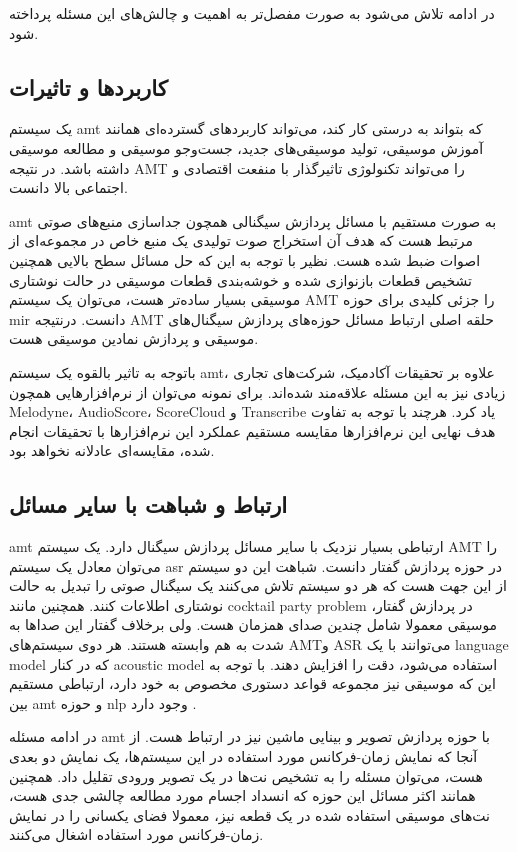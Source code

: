 در ادامه تلاش می‌شود به صورت مفصل‌تر به اهمیت و چالش‌های این مسئله پرداخته شود.

\subsection{کاربردها و تاثیرات}
یک سیستم \gls{amt} که بتواند به درستی کار کند، می‌تواند کاربردهای گسترده‌ای
همانند آموزش موسیقی، تولید موسیقی‌های جدید، جست‌وجو موسیقی و مطالعه موسیقی داشته
باشد. در نتیجه \gls{AMT} را می‌تواند تکنولوژی تاثیرگذار با منفعت اقتصادی و
اجتماعی بالا دانست.

\gls{amt} به صورت مستقیم با مسائل پردازش سیگنالی همچون جداسازی منبع‌های صوتی
مرتبط هست که هدف آن استخراج صوت تولیدی یک منبع خاص در مجموعه‌ای از اصوات ضبط شده
هست. نظیر با توجه به این که حل مسائل سطح بالایی همچنین تشخیص قطعات بازنوازی
شده و خوشه‌بندی قطعات موسیقی در حالت نوشتاری موسیقی بسیار ساده‌تر هست، می‌توان
یک سیستم \gls{AMT} را جزئی کلیدی برای حوزه \gls{mir} دانست. درنتیجه \gls{AMT}
حلقه اصلی ارتباط مسائل حوزه‌های پردازش سیگنال‌های موسیقی و پردازش نمادین موسیقی
هست.

باتوجه به تاثیر بالقوه یک سیستم \gls{amt}، علاوه بر تحقیقات آکادمیک، شرکت‌های
تجاری زیادی نیز به این مسئله علاقه‌مند شده‌اند. برای نمونه می‌توان از
نرم‌افزارهایی همچون Melodyne، AudioScore، ScoreCloud و Transcribe یاد کرد. هرچند
با توجه به تفاوت هدف نهایی این نرم‌افزارها مقایسه مستقیم عملکرد این نرم‌افزارها
با تحقیقات انجام شده، مقایسه‌ای عادلانه نخواهد بود.

\subsection{ارتباط و شباهت با سایر مسائل}
\gls{amt} ارتباطی بسیار نزدیک با سایر مسائل پردازش سیگنال دارد. یک سیستم
\gls{AMT} را می‌توان معادل یک سیستم \gls{asr} در حوزه پردازش گفتار دانست. شباهت
این دو سیستم از این جهت هست که هر دو سیستم تلاش می‌کنند یک سیگنال صوتی را تبدیل
به حالت نوشتاری اطلاعات کنند. همچنین مانند \gls{cocktail party problem} در
پردازش گفتار، موسیقی معمولا شامل چندین صدای همزمان هست. ولی برخلاف گفتار این
صداها به شدت به هم وابسته هستند. هر دوی سیستم‌های \gls{AMT}و \gls{ASR} می‌توانند
با یک \gls{language model} که در کنار \gls{acoustic model} استفاده می‌شود، دقت
را افزایش دهند. با توجه به این که موسیقی نیز مجموعه قواعد دستوری مخصوص به خود
دارد، ارتباطی مستقیم بین \gls{amt} و حوزه \gls{nlp} وجود دارد
\cite{boulanger2012modeling}.

در ادامه مسئله \gls{amt} با حوزه پردازش تصویر و بینایی ماشین نیز در ارتباط هست.
از آنجا که نمایش زمان-فرکانس مورد استفاده در این سیستم‌ها، یک نمایش دو بعدی هست،
می‌توان مسئله را به تشخیص نت‌ها در یک تصویر ورودی تقلیل داد. همچنین همانند اکثر
مسائل این حوزه که انسداد اجسام مورد مطالعه چالشی جدی هست، نت‌های موسیقی استفاده
شده در یک قطعه نیز، معمولا فضای یکسانی را در نمایش زمان-فرکانس مورد استفاده
اشغال می‌کنند.

